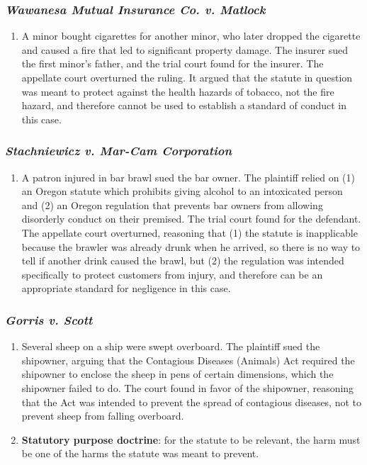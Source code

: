 \subsubsection{\emph{Wawanesa Mutual Insurance Co. v. Matlock}}

\begin{enumerate}
    \item A minor bought cigarettes for another minor, who later dropped the cigarette and caused a fire that led to significant property damage. The insurer sued the first minor's father, and the trial court found for the insurer. The appellate court overturned the ruling. It argued that the statute in question was meant to protect against the health hazards of tobacco, not the fire hazard, and therefore cannot be used to establish a standard of conduct in this case.
\end{enumerate}

\subsubsection{\emph{Stachniewicz v. Mar-Cam Corporation}}

\begin{enumerate}
    \item A patron injured in bar brawl sued the bar owner. The plaintiff relied on (1) an Oregon statute which prohibits giving alcohol to an intoxicated person and (2) an Oregon regulation that prevents bar owners from allowing disorderly conduct on their premised. The trial court found for the defendant. The appellate court overturned, reasoning that (1) the statute is inapplicable because the brawler was already drunk when he arrived, so there is no way to tell if another drink caused the brawl, but (2) the regulation was intended specifically to protect customers from injury, and therefore can be an appropriate standard for negligence in this case.
\end{enumerate}

\subsubsection{\emph{Gorris v. Scott}}

\begin{enumerate}
    \item Several sheep on a ship were swept overboard. The plaintiff sued the shipowner, arguing that the Contagious Diseases (Animals) Act required the shipowner to enclose the sheep in pens of certain dimensions, which the shipowner failed to do. The court found in favor of the shipowner, reasoning that the Act was intended to prevent the spread of contagious diseases, not to prevent sheep from falling overboard.
    \item \textbf{Statutory purpose doctrine}: for the statute to be relevant, the harm must be one of the harms the statute was meant to prevent.
\end{enumerate}

